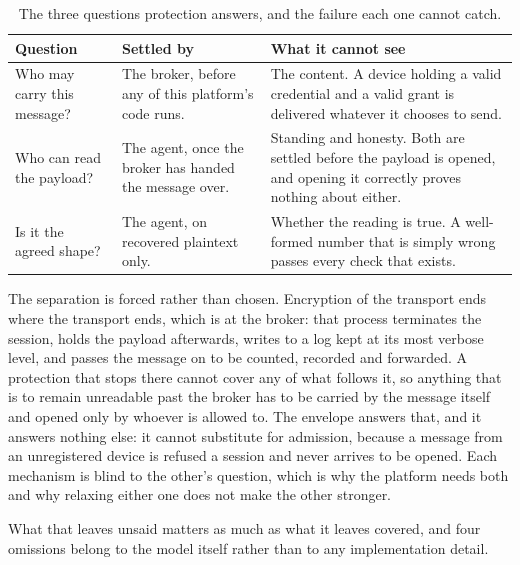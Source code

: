\documentclass[12pt,a4paper]{report}
\begin{document}
\begin{table}[htbp]
\centering
{\small
\begin{tabularx}{\textwidth}{@{}p{4.2cm}p{3.4cm}Y@{}}
\toprule
\textbf{Question} & \textbf{Settled by} & \textbf{What it cannot see} \\
\midrule
Who may carry this message? &
The broker, before any of this platform's code runs. &
The content. A device holding a valid credential and a valid grant is
delivered whatever it chooses to send. \\
\midrule
Who can read the payload? &
The agent, once the broker has handed the message over. &
Standing and honesty. Both are settled before the payload is opened, and
opening it correctly proves nothing about either. \\
\midrule
Is it the agreed shape? &
The agent, on recovered plaintext only. &
Whether the reading is true. A well-formed number that is simply wrong
passes every check that exists. \\
\bottomrule
\end{tabularx}}
\caption{The three questions protection answers, and the failure each one
cannot catch.}
\label{tab:enc-questions}
\end{table}

The separation is forced rather than chosen. Encryption of the transport
ends where the transport ends, which is at the broker: that process
terminates the session, holds the payload afterwards, writes to a log kept
at its most verbose level, and passes the message on to be counted,
recorded and forwarded. A protection that stops there cannot cover any of
what follows it, so anything that is to remain unreadable past the broker
has to be carried by the message itself and opened only by whoever is
allowed to. The envelope answers that, and it answers nothing else: it
cannot substitute for admission, because a message from an unregistered
device is refused a session and never arrives to be opened. Each
mechanism is blind to the other's question, which is why the platform needs
both and why relaxing either one does not make the other stronger.

What that leaves unsaid matters as much as what it leaves covered, and four
omissions belong to the model itself rather than to any implementation
detail.
\end{document}
